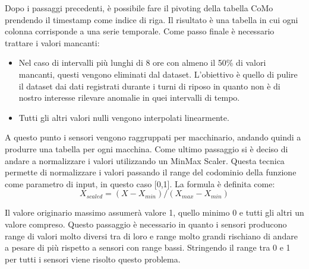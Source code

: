 Dopo i passaggi precedenti, è possibile fare il pivoting della tabella CoMo  prendendo il timestamp come indice di riga. Il risultato è una tabella in cui ogni colonna corrisponde a una serie temporale. 
Come passo finale è necessario trattare i valori mancanti:
\begin{itemize}
	\item Nel caso di intervalli più lunghi di 8 ore con almeno il 50\% di valori mancanti, questi vengono eliminati dal dataset. L'obiettivo è quello di pulire il dataset dai dati registrati durante i turni di riposo in quanto non è di nostro interesse rilevare anomalie in quei intervalli di tempo.
	\item Tutti gli altri valori nulli vengono interpolati linearmente.
\end{itemize}
A questo punto i sensori vengono raggruppati per macchinario, andando quindi a produrre una tabella per ogni macchina.
Come ultimo passaggio si è deciso di andare a normalizzare i valori utilizzando un MinMax Scaler. Questa tecnica permette di normalizzare i valori passando il range del codominio della funzione come parametro di input, in questo caso [0,1]. La formula è definita come:
\[X_{scaled} = (X - X_{min}) / (X_{max} - X_{min})\]

Il valore originario massimo assumerà valore 1, quello minimo 0 e tutti gli altri un valore compreso.
Questo passaggio è necessario in quanto i sensori producono range di valori molto diversi tra di loro e range molto grandi rischiano di andare a pesare di più rispetto a sensori con range bassi. Stringendo il range tra 0 e 1 per tutti i sensori viene risolto questo problema.